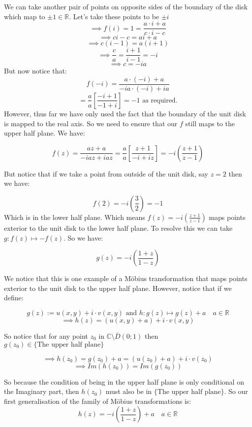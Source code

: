 \documentclass[12pt]{article}
\begin{document}
\noindent We can take another pair of points on opposite sides of the boundary of the disk which map to \(\pm 1 \in \mathbb{R}\).\newline
\linebreak
\noindent Let's take these points to be \(\pm i\)
\[
\implies f(i) = 1 = \frac{a\cdot i + a}{c\cdot i - c } 
\]
\[
\implies ci - c = ai + a
\]
\[
\implies c(i-1) = a(i+1)
\]
\[
\implies \frac{c}{a} = \frac{i+1}{i-1} = -i
\]
\[
\implies c = -ia
\]
But now notice that:
\[
f(-i) = \frac{a\cdot (-i) + a}{-ia\cdot (-i) + ia}
\]
\[
= \frac{a}{a}\left[\frac{-i+1}{-1+i}\right] = -1 \text{  as required.}
\]
\noindent However, thus far we have only used the fact that the boundary of the unit disk is mapped to the real axis. So we need to ensure that our \(f\) still maps to the upper half plane. We have:

\[
f(z) = \frac{az+a}{-iaz+iaz} = \frac{a}{a} \left[\frac{z+1}{-i+iz}\right] = -i \left(\frac{z+1}{z-1}\right)
\]

\noindent But notice that if we take a point from outside of the unit disk, say \(z = 2\) then we have:

\[
f(2) = -i \left(\frac{3}{2}\right) = -1
\]
Which is in the lower half plane. Which means \(f(z) = -i \left(\frac{z+1}{z-1}\right)\) maps points exterior to the unit disk to the lower half plane.\newline
\linebreak
\noindent To resolve this we can take \(g : f(z)  \mapsto -f(z)\). So we have:

\[
g(z) = -i\left(\frac{1+z}{1-z}\right)
\]

\noindent We notice that this is one example of a M\"obius transformation that maps points exterior to the unit disk to the upper half plane. However, notice that if we define:

\[
g(z) := u(x,y) + i\cdot v(x,y) \text{ and } h : g(z) \mapsto g(z) + a \quad a \in \mathbb{R} 
\]
\[
\implies h(z) = \left(u(x,y) + a\right) + i \cdot v(x,y)
\]

\vspace{0.2cm}
\noindent So notice that for any point \(z_0\) in \(\mathbb{C}\setminus \overline{D}(0;1)\) then \(g(z_0) \in \{\text{The upper half plane}\}\)

\[
\implies h(z_0) = g(z_0) + a = \left(u(z_0)+a\right) + i\cdot v(z_0)
\]
\[
\implies Im(h(z_0)) = Im(g(z_0))
\]

\noindent So because the condition of being in the upper half plane is only conditional on the Imaginary part, then \(h(z_0)\) must also be in \(\{\text{The upper half plane}\}\).\newline
\linebreak
\noindent So our first generalisation of the family of M\"obius transformations is:
\[
h(z) = -i \left(\frac{1+z}{1-z}\right) + a \quad a \in \mathbb{R}
\]
\end{document}
